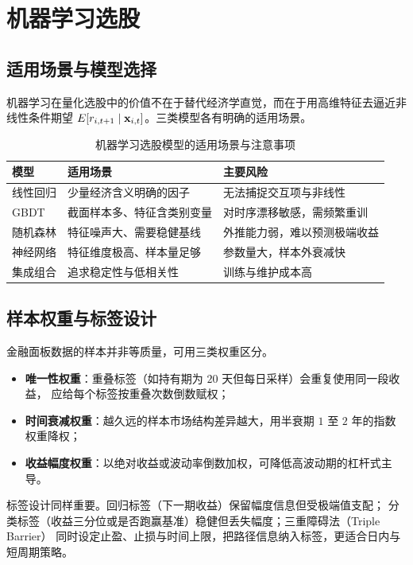 \section{机器学习选股}

\subsection{适用场景与模型选择}

机器学习在量化选股中的价值不在于替代经济学直觉，而在于用高维特征去逼近非线性条件期望
$E[r_{i,t+1} \mid \mathbf{x}_{i,t}]$。三类模型各有明确的适用场景。

\begin{table}[htbp]
\centering
\caption{机器学习选股模型的适用场景与注意事项}\label{tab:07-ml}
\tablefont
\begin{tabular}{@{}llL{5.4cm}@{}}
\toprule
模型 & 适用场景 & 主要风险 \\
\midrule
线性回归 & 少量经济含义明确的因子 & 无法捕捉交互项与非线性 \\
GBDT & 截面样本多、特征含类别变量 & 对时序漂移敏感，需频繁重训 \\
随机森林 & 特征噪声大、需要稳健基线 & 外推能力弱，难以预测极端收益 \\
神经网络 & 特征维度极高、样本量足够 & 参数量大，样本外衰减快 \\
集成组合 & 追求稳定性与低相关性 & 训练与维护成本高 \\
\bottomrule
\end{tabular}
\end{table}

\subsection{样本权重与标签设计}

金融面板数据的样本并非等质量，可用三类权重区分。

\begin{itemize}[leftmargin=*]
  \item \textbf{唯一性权重}：重叠标签（如持有期为 $20$ 天但每日采样）会重复使用同一段收益，
  应给每个标签按重叠次数倒数赋权；
  \item \textbf{时间衰减权重}：越久远的样本市场结构差异越大，用半衰期 $1$ 至 $2$ 年的指数权重降权；
  \item \textbf{收益幅度权重}：以绝对收益或波动率倒数加权，可降低高波动期的杠杆式主导。
\end{itemize}

标签设计同样重要。回归标签（下一期收益）保留幅度信息但受极端值支配；
分类标签（收益三分位或是否跑赢基准）稳健但丢失幅度；三重障碍法（Triple Barrier）
同时设定止盈、止损与时间上限，把路径信息纳入标签，更适合日内与短周期策略。


